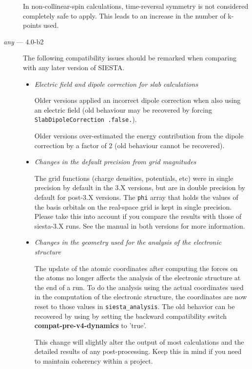\documentclass{article}
\newcommand\siesta{\textsc{SIESTA}}
\newcommand{\opt}[1]{\textbf{#1}}
\newcommand{\code}[1]{\texttt{#1}}
\begin{document}
\begin{description}
  In non-collinear-spin calculations, time-reversal symmetry is not
  considered completely safe to apply. This leads to an increase in
  the number of k-points used.

  \item[\emph{any} --- 4.0-b2] The following compatibility issues should be remarked when
  comparing with any later version of \siesta.

  \begin{itemize}
    \item \emph{Electric field and dipole correction for slab calculations}

    Older versions applied an incorrect dipole correction when also using an
    electric field (old behaviour may be recovered by forcing \code{SlabDipoleCorrection .false.}). 

    Older versions over-estimated the energy contribution from the dipole correction by a
    factor of 2 (old behaviour cannot be recovered).

  \item\emph{Changes in the default precision from grid magnitudes}

    The grid functions (charge densities, potentials, etc) were in
    single precision by default in the 3.X versions, but are in double
    precision by default for post-3.X versions. The \code{phi}  array that
    holds the values of the basis orbitals on the real-space grid is kept in
    single precision. Please take this into account if you compare the
    results with those of siesta-3.X runs. See the manual in both
    versions for more information.

  \item\emph{Changes in the geometry used for the analysis of the
    electronic structure}

  The update of the atomic coordinates after computing the forces on
  the atoms no longer affects the analysis of the electronic
  structure at the end of a run. To do the analysis using the actual
  coordinates used in the computation of the electronic structure, the
  coordinates are now reset to those values in \code{siesta\_analysis}.  The old
  behavior can be recovered by using by setting the backward
  compatibility switch \opt{compat-pre-v4-dynamics} to 'true'.

  This change will slightly alter the output of most calculations and the
  detailed results of any post-processing. Keep this in mind if you
  need to maintain coherency within a project.



\end{itemize}
\end{description}
\end{document}
